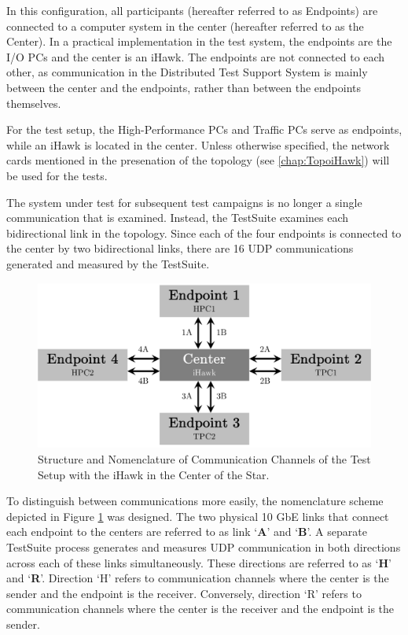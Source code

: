 In this configuration, all participants (hereafter referred to as Endpoints) are connected to a computer system in the center (hereafter referred to as the Center). In a practical implementation in the test system, the endpoints are the I/O PCs and the center is an iHawk. The endpoints are not connected to each other, as communication in the Distributed Test Support System is mainly between the center and the endpoints, rather than between the endpoints themselves.

For the test setup, the High-Performance PCs and Traffic PCs serve as endpoints, while an iHawk is located in the center. Unless otherwise specified, the network cards mentioned in the presenation of the topology (see \ref{chap:TopoiHawk}) will be used for the tests.

The system under test for subsequent test campaigns is no longer a single communication that is examined. Instead, the TestSuite examines each bidirectional link in the topology. Since each of the four endpoints is connected to the center by two bidirectional links, there are 16 UDP communications generated and measured by the TestSuite.

\begin{figure}[h!]
    \centering
    \includegraphics[width=0.8\linewidth]{figures/reliability/ihawk/topo.pdf}
    \caption{Structure and Nomenclature of Communication Channels of the Test Setup with the iHawk in the Center of the Star.}
    \label{fig:topoihawknaming}
\end{figure}

To distinguish between communications more easily, the nomenclature scheme depicted in Figure \ref{fig:topoihawknaming} was designed. The two physical 10 GbE links that connect each endpoint to the centers are referred to as link `\textbf{A}' and `\textbf{B}'. A separate TestSuite process generates and measures UDP communication in both directions across each of these links simultaneously. These directions are referred to as `\textbf{H}' and `\textbf{R}'. Direction `H' refers to communication channels where the center is the sender and the endpoint is the receiver. Conversely, direction `R' refers to communication channels where the center is the receiver and the endpoint is the sender.


